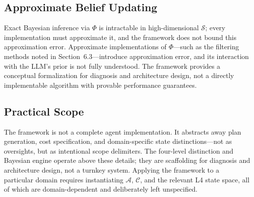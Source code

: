 \subsection{Approximate Belief Updating}

Exact Bayesian inference via $\Phi$ is intractable in high-dimensional $\mathcal{S}$; every implementation must approximate it, and the framework does not bound this approximation error. Approximate implementations of $\Phi$---such as the filtering methods noted in Section~6.3---introduce approximation error, and its interaction with the LLM's prior is not fully understood. The framework provides a conceptual formalization for diagnosis and architecture design, not a directly implementable algorithm with provable performance guarantees.

\subsection{Practical Scope}

The framework is not a complete agent implementation. It abstracts away plan generation, cost specification, and domain-specific state distinctions---not as oversights, but as intentional scope delimiters. The four-level distinction and Bayesian engine operate above these details; they are scaffolding for diagnosis and architecture design, not a turnkey system. Applying the framework to a particular domain requires instantiating $\mathcal{A}$, $\mathcal{C}$, and the relevant L4 state space, all of which are domain-dependent and deliberately left unspecified.
